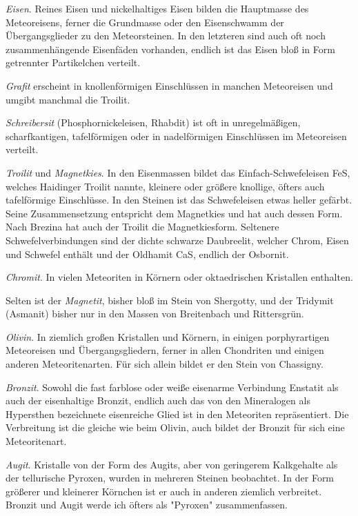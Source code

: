 \documentclass[a4paper, 11pt, oneside, polutonikogreek, german]{article}
\begin{document}
\emph{Eisen}. Reines Eisen und nickelhaltiges Eisen bilden die Hauptmasse des Meteoreisens, ferner die Grundmasse oder den Eisenschwamm der Übergangsglieder zu den Meteorsteinen. In den letzteren sind auch oft noch zusammenhängende Eisenfäden vorhanden, endlich ist das Eisen bloß in Form getrennter Partikelchen verteilt.

\emph{Grafit} erscheint in knollenförmigen Einschlüssen in manchen Meteoreisen und umgibt manchmal die Troilit.

\emph{Schreibersit} (Phosphornickeleisen, Rhabdit) ist oft in unregelmäßigen, scharfkantigen, tafelförmigen oder in nadelförmigen Einschlüssen im Meteoreisen verteilt.

\emph{Troilit} und \emph{Magnetkies}. In den Eisenmassen bildet das Einfach-Schwefeleisen FeS, welches Haidinger Troilit nannte, kleinere oder größere knollige, öfters auch tafelförmige Einschlüsse. In den Steinen ist das Schwefeleisen etwas heller gefärbt. Seine Zusammensetzung entspricht dem Magnetkies und hat auch dessen Form. Nach Brezina hat auch der Troilit die Magnetkiesform. Seltenere Schwefelverbindungen sind der dichte schwarze Daubreelit, welcher Chrom, Eisen und Schwefel enthält und der Oldhamit CaS, endlich der Osbornit.

\emph{Chromit}. In vielen Meteoriten in Körnern oder oktaedrischen Kristallen enthalten.

Selten ist der \emph{Magnetit}, bisher bloß im Stein von Shergotty, und der Tridymit (Asmanit) bisher nur in den Massen von Breitenbach und Rittersgrün.

\emph{Olivin}. In ziemlich großen Kristallen und Körnern, in einigen porphyrartigen Meteoreisen und Übergangsgliedern, ferner in allen Chondriten und einigen anderen Meteoritenarten. Für sich allein bildet er den Stein von Chassigny.

\emph{Bronzit}. Sowohl die fast farblose oder weiße eisenarme Verbindung Enstatit als auch der eisenhaltige Bronzit, endlich auch das von den Mineralogen als Hypersthen bezeichnete eisenreiche Glied ist in den Meteoriten repräsentiert. Die Verbreitung ist die gleiche wie beim Olivin, auch bildet der Bronzit für sich eine Meteoritenart.

\emph{Augit}. Kristalle von der Form des Augits, aber von geringerem Kalkgehalte als der tellurische Pyroxen, wurden in mehreren Steinen beobachtet. In der Form größerer und kleinerer Körnchen ist er auch in anderen ziemlich verbreitet. Bronzit und Augit werde ich öfters als "Pyroxen" zusammenfassen.
\end{document}
